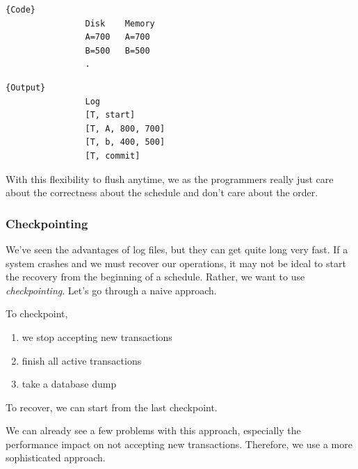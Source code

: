 \documentclass{article}
\begin{document}
\begin{example}
\begin{enumerate}
            \noindent\begin{minipage}{.46\textwidth}
              \begin{lstlisting}[]{Code}
                Disk    Memory
                A=700   A=700
                B=500   B=500
                .
              \end{lstlisting}
              \end{minipage}
              \hfill
              \begin{minipage}{.45\textwidth}
              \begin{lstlisting}[]{Output}
                Log 
                [T, start]
                [T, A, 800, 700]
                [T, b, 400, 500] 
                [T, commit]
              \end{lstlisting}
            \end{minipage} 

        \end{enumerate}
      \end{example}

      With this flexibility to flush anytime, we as the programmers really just care about the correctness about the schedule and don't care about the order.  

    \subsubsection{Checkpointing} 
      
      We've seen the advantages of log files, but they can get quite long very fast. If a system crashes and we must recover our operations, it may not be ideal to start the recovery from the beginning of a schedule. Rather, we want to use \textit{checkpointing}. Let's go through a naive approach. 

      \begin{definition}
         To checkpoint, 
         \begin{enumerate}
           \item we stop accepting new transactions 
           \item finish all active transactions 
           \item take a database dump
         \end{enumerate}
         To recover, we can start from the last checkpoint. 
      \end{definition} 

      We can already see a few problems with this approach, especially the performance impact on not accepting new transactions. Therefore, we use a more sophisticated approach. 
\end{document}
